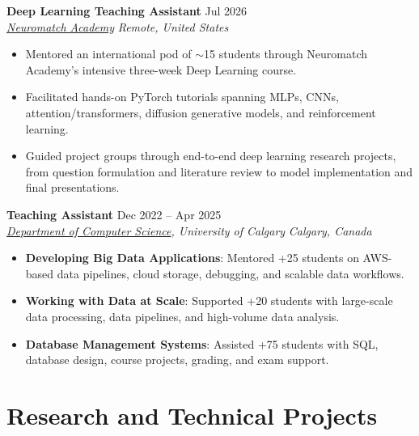 \documentclass[a4paper,10pt]{article}
\newcommand{\resumeSubheading}[4]{
    \textbf{#1} \hfill #2 \\
    \textit{#3} \hfill \textit{#4}
}
\begin{document}
\resumeSubheading
{Deep Learning Teaching Assistant}
{Jul 2026}
{\href{https://neuromatch.io/}{Neuromatch Academy}}
{Remote, United States}
\begin{itemize}[leftmargin=0.25in]
    \item Mentored an international pod of $\sim$15 students through Neuromatch Academy's intensive three-week Deep Learning course.
    \item Facilitated hands-on PyTorch tutorials spanning MLPs, CNNs, attention/transformers, diffusion generative models, and reinforcement learning.
    \item Guided project groups through end-to-end deep learning research projects, from question formulation and literature review to model implementation and final presentations.
\end{itemize}

\resumeSubheading
{Teaching Assistant}
{Dec 2022 -- Apr 2025}
{\href{https://science.ucalgary.ca/computer-science} {Department of Computer Science}, University of Calgary}
{Calgary, Canada}
\begin{itemize}[leftmargin=0.25in]
    \item \textbf{Developing Big Data Applications}: Mentored +25 students on AWS-based data pipelines, cloud storage, debugging, and scalable data workflows. 
    \item \textbf{Working with Data at Scale}: Supported +20 students with large-scale data processing, data pipelines, and high-volume data analysis. 
    \item \textbf{Database Management Systems}: Assisted +75 students with SQL, database design, course projects, grading, and exam support.
\end{itemize}


\section*{Research and Technical Projects}
\end{document}
